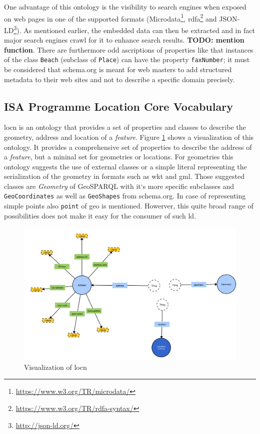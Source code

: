\documentclass[draft,final]{vutinfth} %
\newcommand{\todo}[1]{{\color{red}\textbf{TODO: {#1}}}} %
\begin{document}
One advantage of this ontology is the visibility to search engines when exposed on web pages in one of the supported formats (Microdata\footnote{\url{https://www.w3.org/TR/microdata/}}, \gls{rdfa}\footnote{\url{https://www.w3.org/TR/rdfa-syntax/}} and JSON-LD\footnote{\url{http://json-ld.org/}}). As mentioned earlier, the embedded data can then be extracted and in fact major search engines crawl for it to enhance search results\cite{haas_enhanced_2011}. \todo{mention function}. There are furthermore odd ascriptions of properties  like that instances of the class \texttt{Beach} (subclass of \texttt{Place}) can have the property \texttt{faxNumber}; it must be considered that schema.org is meant for web masters to add structured metadata to their web sites \cite{veres_schema.org_2013} and not to describe a specific domain precisely.

\subsection{ISA Programme Location Core Vocabulary}
\gls{locn} is an ontology that provides a set of properties and classes to describe the geometry, address and location of a \textit{feature}. Figure \ref{fig:related-work-geospatial-ontologies:locn} shows a visualization of this ontology. It provides a comprehensive set of properties to describe the address of a \textit{feature}, but a mininal set for geometries or locations. For geometries this ontology suggests the use of external classes or a simple literal representing the serialization of the geometry in formats such as \gls{wkt} and \gls{gml}. Those suggested classes are \textit{Geometry} of GeoSPARQL with it`s more specific subclasses and \texttt{GeoCoordinates} as well as \texttt{GeoShapes} from schema.org. In case of representing simple points also \texttt{point} of \gls{geo} is mentioned. \cite{perego_isa_2015} Howerver, this quite broad range of possibilities does not make it easy for the consumer of such \gls{ld}.

\begin{figure}[h]
    \centering
    \includegraphics[width=1.0\textwidth]{graphics/vocabularies/locn.png}
    \caption{Visualization of \gls{locn}}
    \label{fig:related-work-geospatial-ontologies:locn}
\end{figure}
\end{document}
